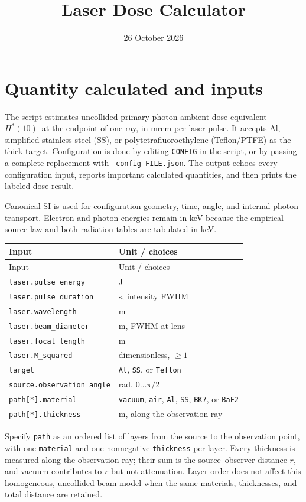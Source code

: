 \documentclass[10pt,a4paper]{article}
\title{Laser Dose Calculator}
\date{26 October 2026}
\newcommand{\hstar}{\ensuremath{H^*(10)}}
\begin{document}
\maketitle

\section{Quantity calculated and inputs}
The script estimates uncollided-primary-photon ambient dose equivalent \hstar\ at the endpoint of one ray, in mrem per laser pulse. It accepts Al, simplified stainless steel (SS), or polytetrafluoroethylene (Teflon/PTFE) as the thick target. Configuration is done by editing \texttt{CONFIG} in the script, or by passing a complete replacement with \texttt{--config FILE.json}. The output echoes every configuration input, reports important calculated quantities, and then prints the labeled dose result.

Canonical SI is used for configuration geometry, time, angle, and internal photon transport. Electron and photon energies remain in keV because the empirical source law and both radiation tables are tabulated in keV.

\begin{longtable}{ll}
\toprule
Input & Unit / choices\\\midrule
\endfirsthead
\toprule Input & Unit / choices\\\midrule\endhead
\bottomrule\endfoot
\texttt{laser.pulse\_energy} & J\\
\texttt{laser.pulse\_duration} & s, intensity FWHM\\
\texttt{laser.wavelength} & m\\
\texttt{laser.beam\_diameter} & m, FWHM at lens\\
\texttt{laser.focal\_length} & m\\
\texttt{laser.M\_squared} & dimensionless, $\geq1$\\
\texttt{target} & \texttt{Al}, \texttt{SS}, or \texttt{Teflon}\\
\texttt{source.observation\_angle} & rad, $0\ldots\pi/2$\\
\texttt{path[*].material} & \texttt{vacuum}, \texttt{air}, \texttt{Al}, \texttt{SS}, \texttt{BK7}, or \texttt{BaF2}\\
\texttt{path[*].thickness} & m, along the observation ray\\
\end{longtable}
Specify \texttt{path} as an ordered list of layers from the source to the observation point, with one \texttt{material} and one nonnegative \texttt{thickness} per layer. Every thickness is measured along the observation ray; their sum is the source--observer distance $r$, and vacuum contributes to $r$ but not attenuation. Layer order does not affect this homogeneous, uncollided-beam model when the same materials, thicknesses, and total distance are retained.
\end{document}
